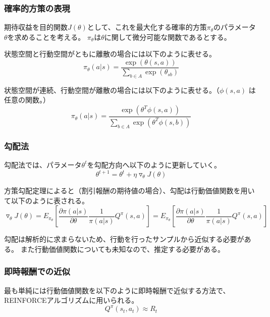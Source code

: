 \documentclass[]{jarticle}
\begin{document}
\subsubsection*{確率的方策の表現}
期待収益を目的関数$J(\theta)$として、これを最大化する確率的方策$\pi_{\theta}$のパラメータ$\theta$を求めることを考える。
$\pi_{\theta}$は$\theta$に関して微分可能な関数であるとする。

状態空間と行動空間がともに離散の場合には以下のように表せる。
\begin{equation*}
\pi_\theta(a|s) = \dfrac{\exp(\theta(s,a))}{\sum_{b \in A} \exp(\theta_{sb})}
\end{equation*}

状態空間が連続、行動空間が離散の場合には以下のように表せる。（$\phi(s,a)$ は任意の関数。）
\begin{equation*}
\pi_\theta(a|s) = \dfrac{\exp(\theta^T \phi(s,a))}{\sum_{b \in A} \exp(\theta^T \phi(s,b))}\end{equation*}

\subsubsection*{勾配法}
勾配法では、パラメータ$\theta^t$を勾配方向へ以下のように更新していく。
\begin{equation*}
\theta^{t+1} = \theta^t + \eta \triangledown_\theta J(\theta)
\end{equation*}

方策勾配定理によると（割引報酬の期待値の場合）、勾配は行動価値関数を用いて以下のように表される。
\begin{equation*}
\triangledown_\theta J(\theta) = 
E_{\pi_{\theta}} [\dfrac{\partial \pi(a|s)}{\partial \theta}  \dfrac{1}{\pi(a|s)} Q^{\pi}(s,a)] 
= E_{\pi_{\theta}} [\dfrac{\partial \pi(a|s)}{\partial \theta}  \dfrac{1}{\pi(a|s)} Q^{\pi}(s,a)]
\end{equation*}

勾配は解析的に求まらないため、行動を行ったサンプルから近似する必要がある。
また行動価値関数についても未知なので、推定する必要がある。

\subsubsection*{即時報酬での近似}
最も単純には行動価値関数を以下のように即時報酬で近似する方法で、REINFORCEアルゴリズムに用いられる。
\begin{equation*}
Q^\pi(s_t, a_t) \approx R_t
\end{equation*}
\end{document}
